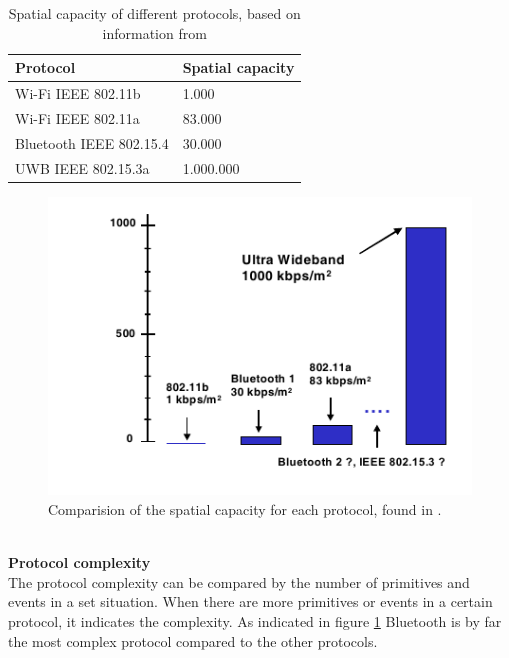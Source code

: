\documentclass[10pt,a4paper]{article}
\begin{document}
\begin{table}[H]
\centering
\caption{Spatial capacity of different protocols, based on information from \cite{ultrawidebandshortmediumrange}}
\label{spatialcapacity}
\begin{tabular}{|l|l|}
\hline
\textbf{Protocol}  & \textbf{Spatial capacity} \\ \hline
Wi-Fi IEEE 802.11b & 1.000                     \\ \hline
Wi-Fi IEEE 802.11a & 83.000                    \\ \hline
Bluetooth IEEE 802.15.4          & 30.000                    \\ \hline
UWB IEEE 802.15.3a                & 1.000.000                 \\ \hline
\end{tabular}
\end{table}



\begin{figure}[H]
   \centering
   \includegraphics[width=1\textwidth]{spatialcapacity}
   \caption{Comparision of the spatial capacity for each protocol, found in \cite{ultrawidebandshortmediumrange}.}
   \label{fig:protocolcomplexity}
\end{figure}

\textbf{\\Protocol complexity}\\
The protocol complexity can be compared by the number of primitives and events in a set situation. When there are more primitives or events in a certain protocol, it indicates the complexity. \cite{comparitivestudywirelessprotocols} As indicated in figure \ref{fig:protocolcomplexity} Bluetooth is by far the most complex protocol compared to the other protocols.
\end{document}
